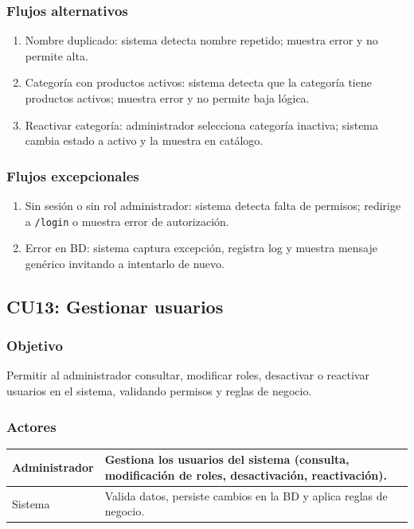 \documentclass[12pt,a4paper]{article}
\begin{document}
\subsubsection*{Flujos alternativos}
\begin{enumerate}[label=FA-\arabic*]
    \item Nombre duplicado: sistema detecta nombre repetido; muestra error y no permite alta.
    \item Categoría con productos activos: sistema detecta que la categoría tiene productos activos; muestra error y no permite baja lógica.
    \item Reactivar categoría: administrador selecciona categoría inactiva; sistema cambia estado a activo y la muestra en catálogo.
\end{enumerate}

\subsubsection*{Flujos excepcionales}
\begin{enumerate}[label=FE-\arabic*]
    \item Sin sesión o sin rol administrador: sistema detecta falta de permisos; redirige a \texttt{/login} o muestra error de autorización.
    \item Error en BD: sistema captura excepción, registra log y muestra mensaje genérico invitando a intentarlo de nuevo.
\end{enumerate}


\subsection{CU13: Gestionar usuarios}
\subsubsection*{Objetivo}
Permitir al administrador consultar, modificar roles, desactivar o reactivar usuarios en el sistema, validando permisos y reglas de negocio.

\subsubsection*{Actores}
\begin{longtable}{|l|p{10cm}|}
    \hline
    Administrador & Gestiona los usuarios del sistema (consulta, modificación de roles, desactivación, reactivación). \\ \hline
    Sistema       & Valida datos, persiste cambios en la BD y aplica reglas de negocio.                               \\ \hline
\end{longtable}
\end{document}
